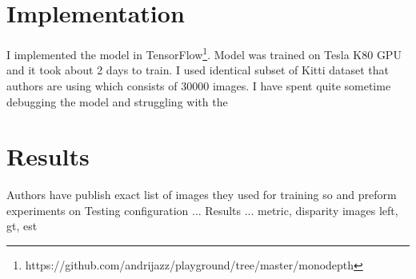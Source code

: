 \documentclass{article}
\begin{document}
\section{Implementation}
   
I implemented the model in TensorFlow\footnote{https://github.com/andrijazz/playground/tree/master/monodepth}. Model was trained on Tesla K80 GPU and it took about 2 days to train. I used identical subset of Kitti dataset that authors are using which consists of 30000 images. I have spent quite sometime debugging the model and struggling with the 


\section{Results}
Authors have publish exact list of images they used for training so and preform experiments on Testing configuration ...
Results ... metric, disparity images left, gt, est




\end{document}
